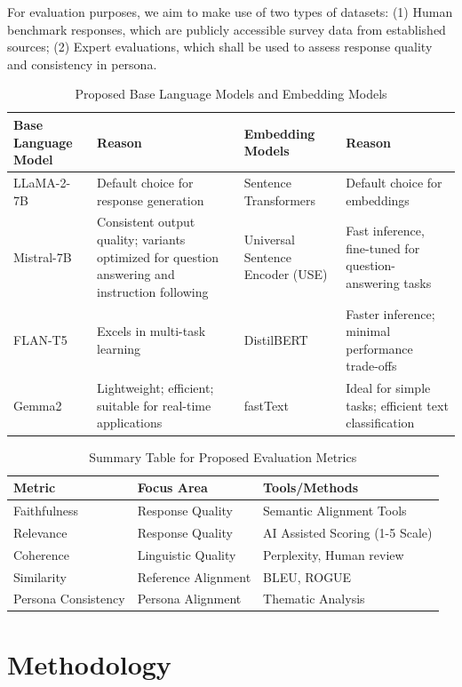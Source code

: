 \documentclass[11pt]{article}
\begin{document}
For evaluation purposes, we aim to make use of two types of datasets: (1) Human benchmark responses, which are publicly accessible survey data from established sources; (2) Expert evaluations, which shall be used to assess response quality and consistency in persona.
\begin{table}[ht]
  \centering
  \begin{tabular}{|p{3cm}|p{5cm}|p{3cm}|p{5cm}|}
    \hline
    \textbf{Base Language Model} & \textbf{Reason} & \textbf{Embedding Models} & \textbf{Reason} \\
    \hline
    LLaMA-2-7B & Default choice for response generation & Sentence Transformers & Default choice for embeddings \\
    \hline
    Mistral-7B & Consistent output quality; variants optimized for question answering and instruction following & Universal Sentence Encoder (USE) & Fast inference, fine-tuned for question-answering tasks \\
    \hline
    FLAN-T5 & Excels in multi-task learning & DistilBERT & Faster inference; minimal performance trade-offs \\
    \hline
    Gemma2 & Lightweight; efficient; suitable for real-time applications & fastText & Ideal for simple tasks; efficient text classification \\
    \hline
  \end{tabular}
  \caption{Proposed Base Language Models and Embedding Models}
\end{table}
\begin{table}[ht]
  \centering
  \begin{tabular}{|p{3cm}|p{5cm}|p{3cm}|}
    \hline
    \textbf{Metric}& \textbf{Focus Area}& \textbf{Tools/Methods}\\
    \hline
    Faithfulness& Response Quality& Semantic Alignment Tools\\
    \hline
    Relevance& Response Quality& AI Assisted Scoring (1-5 Scale)\\
    \hline
    Coherence& Linguistic Quality& Perplexity, Human review\\
    \hline
    Similarity& Reference Alignment& BLEU, ROGUE\\
    \hline
 Persona Consistency& Persona Alignment&Thematic Analysis\\\hline
  \end{tabular}
  \caption{Summary Table for Proposed Evaluation Metrics}
\end{table}
\section{Methodology}
\end{document}
